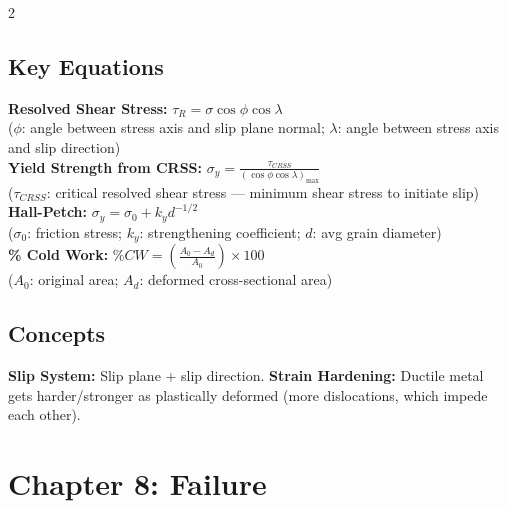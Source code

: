 \documentclass[8pt]{extarticle}
\begin{document}
\begin{multicols*}{2}
\subsection*{Key Equations}
\textbf{Resolved Shear Stress:} $\tau_R = \sigma\cos\phi\cos\lambda$ \\
($\phi$: angle between stress axis and slip plane normal; $\lambda$: angle between stress axis and slip direction) \\
\textbf{Yield Strength from CRSS:} $\sigma_y = \frac{\tau_{CRSS}}{(\cos\phi\cos\lambda)_{\max}}$ \\
($\tau_{CRSS}$: critical resolved shear stress — minimum shear stress to initiate slip) \\
\textbf{Hall-Petch:} $\sigma_y = \sigma_0 + k_y d^{-1/2}$ \\
($\sigma_0$: friction stress; $k_y$: strengthening coefficient; $d$: avg grain diameter) \\
\textbf{\% Cold Work:} $\%CW = \left(\frac{A_0 - A_d}{A_0}\right)\times100$ \\
($A_0$: original area; $A_d$: deformed cross-sectional area)
\subsection*{Concepts}
\textbf{Slip System:} Slip plane + slip direction. \textbf{Strain Hardening:} Ductile metal gets harder/stronger as plastically deformed (more dislocations, which impede each other).

\section*{Chapter 8: Failure}

\end{multicols*}
\end{document}

